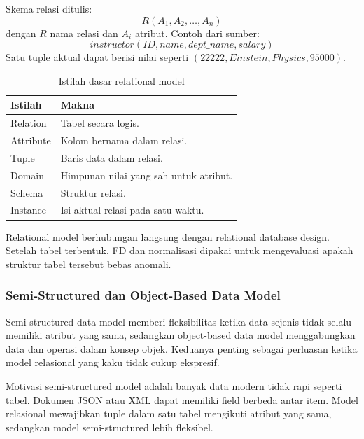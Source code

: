 Skema relasi ditulis:
\begin{equation}
    R(A_1,A_2,\ldots,A_n)
    \label{eq:modeldata-relation-schema}
\end{equation}
dengan \(R\) nama relasi dan \(A_i\) atribut. Contoh dari sumber:
\[
    instructor(ID, name, dept\_name, salary)
\]
Satu tuple aktual dapat berisi nilai seperti \((22222, Einstein, Physics, 95000)\).

\begin{table}[H]
\centering
\begin{tabularx}{\textwidth}{|L{0.22\textwidth}|X|}
\hline
\textbf{Istilah} & \textbf{Makna} \\
\hline
Relation & Tabel secara logis. \\
\hline
Attribute & Kolom bernama dalam relasi. \\
\hline
Tuple & Baris data dalam relasi. \\
\hline
Domain & Himpunan nilai yang sah untuk atribut. \\
\hline
Schema & Struktur relasi. \\
\hline
Instance & Isi aktual relasi pada satu waktu. \\
\hline
\end{tabularx}
\caption{Istilah dasar relational model}
\label{tab:relational-basic-modeldata}
\end{table}

Relational model berhubungan langsung dengan relational database design. Setelah tabel terbentuk, FD dan normalisasi dipakai untuk mengevaluasi apakah struktur tabel tersebut bebas anomali.

\subsubsection{Semi-Structured dan Object-Based Data Model}

\begin{jawab}
Semi-structured data model memberi fleksibilitas ketika data sejenis tidak selalu memiliki atribut yang sama, sedangkan object-based data model menggabungkan data dan operasi dalam konsep objek. Keduanya penting sebagai perluasan ketika model relasional yang kaku tidak cukup ekspresif.
\end{jawab}

Motivasi semi-structured model adalah banyak data modern tidak rapi seperti tabel. Dokumen JSON atau XML dapat memiliki field berbeda antar item. Model relasional mewajibkan tuple dalam satu tabel mengikuti atribut yang sama, sedangkan model semi-structured lebih fleksibel.

